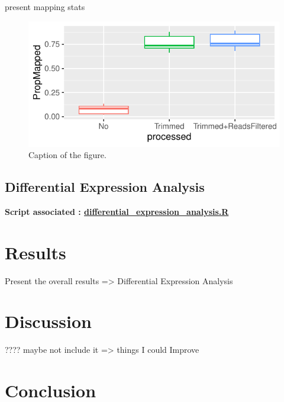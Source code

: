 \documentclass[a4paper, 11pt]{article}
\begin{document}
\begin{multicols}{2}
present mapping stats
\begin{figure}[H]
    \centering
    \includegraphics[width=1\columnwidth]{Figures/mapping_props.pdf}
    \caption{Caption of the figure.}
    \label{fig:mapping}
\end{figure}
\subsection{Differential Expression Analysis}
\begin{scriptsize}
	\textbf{Script associated : \href{https://github.com/leopoldguyot/BINF-402_Transcriptomic_Project/blob/main/differential_expression_analysis.R}{differential\_expression\_analysis.R}} 
\end{scriptsize}


\section{Results}

Present the overall results => Differential Expression Analysis


\section{Discussion}
???? maybe not include it
=> things I could Improve


\section{Conclusion}




\end{multicols}
\end{document}
